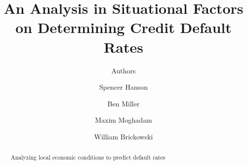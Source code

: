 \documentclass[sigconf]{acmart}
\begin{document}
\title{An Analysis in Situational Factors on Determining Credit Default Rates}
\subtitle{Authors}

\author{Spencer Hanson}
\affiliation{}

\author{Ben Miller}
\affiliation{}

\author{Maxim Moghadam}
\affiliation{}

\author{William Brickowski}
\affiliation{}


\begin{abstract}
Analyzing local economic conditions to predict default rates
\end{abstract}

\begin{CCSXML}

\end{CCSXML} 



\maketitle




\end{document}
